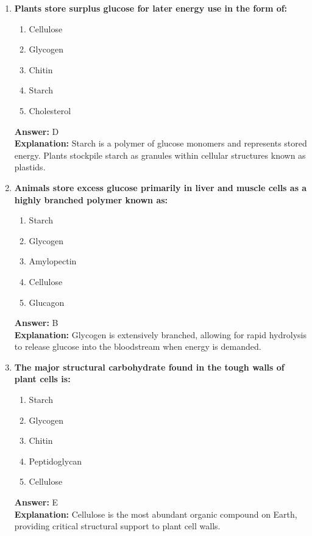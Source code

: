 \documentclass[11pt, a4paper]{article}
\begin{document}
\begin{enumerate}
\item \textbf{Plants store surplus glucose for later energy use in the form of:}
\begin{enumerate}[label=\Alph*.]
    \item Cellulose
    \item Glycogen
    \item Chitin
    \item Starch
    \item Cholesterol
\end{enumerate}
\textbf{Answer:} D \\
\textbf{Explanation:} Starch is a polymer of glucose monomers and represents stored energy. Plants stockpile starch as granules within cellular structures known as plastids.

\item \textbf{Animals store excess glucose primarily in liver and muscle cells as a highly branched polymer known as:}
\begin{enumerate}[label=\Alph*.]
    \item Starch
    \item Glycogen
    \item Amylopectin
    \item Cellulose
    \item Glucagon
\end{enumerate}
\textbf{Answer:} B \\
\textbf{Explanation:} Glycogen is extensively branched, allowing for rapid hydrolysis to release glucose into the bloodstream when energy is demanded.

\item \textbf{The major structural carbohydrate found in the tough walls of plant cells is:}
\begin{enumerate}[label=\Alph*.]
    \item Starch
    \item Glycogen
    \item Chitin
    \item Peptidoglycan
    \item Cellulose
\end{enumerate}
\textbf{Answer:} E \\
\textbf{Explanation:} Cellulose is the most abundant organic compound on Earth, providing critical structural support to plant cell walls.


\end{enumerate}
\end{document}
